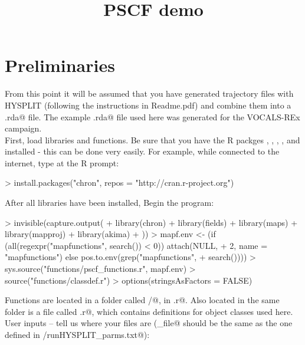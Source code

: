 \documentclass{article}
\title{PSCF demo}
\date{}
\renewenvironment{Schunk}{\vspace{\topsep}}{\vspace{\topsep}}
\begin{document}
\maketitle
\hrulefill
\tableofcontents
\hrulefill

\section{Preliminaries}

From this point it will be assumed that you have generated trajectory
files with HYSPLIT (following the instructions in Readme.pdf) and
combine them into a \verb@coords.rda@ file. The example
\verb@coords.rda@ file used here was generated for the VOCALS-REx campaign.\\

First, load libraries and functions. Be sure that you have the R
packges \verb@chron@, \verb@fields@, \verb@maps@, \verb@mapproj@, and
\verb@akima@ installed - this can be done very easily. For example,
while connected to the internet, type at the R prompt:

\begin{Schunk}
\begin{Sinput}
> install.packages("chron", repos = "http://cran.r-project.org")
\end{Sinput}
\end{Schunk}

After all libraries have been installed, Begin the program:
\begin{Schunk}
\begin{Sinput}
> invisible(capture.output({
+     library(chron)
+     library(fields)
+     library(maps)
+     library(mapproj)
+     library(akima)
+ }))
> mapf.env <- (if (all(regexpr("mapfunctions", search()) < 0)) attach(NULL, 
+     2, name = "mapfunctions") else pos.to.env(grep("mapfunctions", 
+     search())))
> sys.source("functions/pscf_functions.r", mapf.env)
> source("functions/classdef.r")
> options(stringsAsFactors = FALSE)
\end{Sinput}
\end{Schunk}

Functions are located in a folder called \verb@functions/@, in
\verb@functions.r@. Also located in the same folder is a file called
\verb@classdef.r@, which contains definitions for object classes used here.\\

\smallskip
User inputs -- tell us where your files are (\verb@Coords_file@ should be the same as the one defined in \verb@userinputs/runHYSPLIT_parms.txt@):
\end{document}

